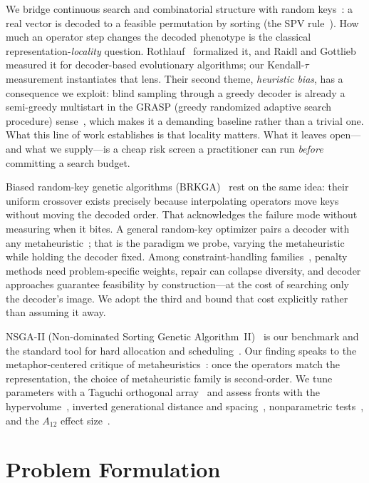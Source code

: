 \documentclass[runningheads]{llncs}
\begin{document}
We bridge continuous search and combinatorial structure with random keys~\cite{bean}: a real vector is decoded to a feasible permutation by sorting (the SPV rule~\cite{tasgetiren}). How much an operator step changes the decoded phenotype is the classical representation-\emph{locality} question. Rothlauf~\cite{rothlauf} formalized it, and Raidl and Gottlieb~\cite{raidl} measured it for decoder-based evolutionary algorithms; our Kendall-$\tau$ measurement instantiates that lens. Their second theme, \emph{heuristic bias}, has a consequence we exploit: blind sampling through a greedy decoder is already a semi-greedy multistart in the GRASP (greedy randomized adaptive search procedure) sense~\cite{feo}, which makes it a demanding baseline rather than a trivial one. What this line of work establishes is that locality matters. What it leaves open---and what we supply---is a cheap risk screen a practitioner can run \emph{before} committing a search budget.

Biased random-key genetic algorithms (BRKGA)~\cite{goncalves,londe} rest on the same idea: their uniform crossover exists precisely because interpolating operators move keys without moving the decoded order. That acknowledges the failure mode without measuring when it bites. A general random-key optimizer pairs a decoder with any metaheuristic~\cite{chaves}; that is the paradigm we probe, varying the metaheuristic while holding the decoder fixed. Among constraint-handling families~\cite{rahimi}, penalty methods need problem-specific weights, repair can collapse diversity, and decoder approaches guarantee feasibility by construction---at the cost of searching only the decoder's image. We adopt the third and bound that cost explicitly rather than assuming it away.

NSGA-II (Non-dominated Sorting Genetic Algorithm~II)~\cite{deb} is our benchmark and the standard tool for hard allocation and scheduling~\cite{zhang}. Our finding speaks to the metaphor-centered critique of metaheuristics~\cite{aranha,sorensen}: once the operators match the representation, the choice of metaheuristic family is second-order. We tune parameters with a Taguchi orthogonal array~\cite{alrafei,montgomery} and assess fronts with the hypervolume~\cite{zitzler}, inverted generational distance and spacing~\cite{coello}, nonparametric tests~\cite{derrac}, and the $A_{12}$ effect size~\cite{vargha}.

\section{Problem Formulation}
\label{sec:formulation}
\end{document}
